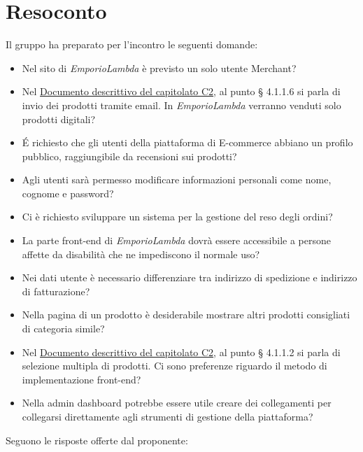 \section{Resoconto}
Il gruppo ha preparato per l'incontro le seguenti domande:
\begin{itemize}
\item Nel sito di \textit{EmporioLambda} è previsto un solo utente Merchant?
\item Nel \href{https://www.math.unipd.it/~tullio/IS-1/2020/Progetto/C2.pdf}{Documento descrittivo del capitolato C2}, al punto § 4.1.1.6 si parla di invio dei prodotti tramite email. In \textit{EmporioLambda} verranno venduti solo prodotti digitali?
\item É richiesto che gli utenti della piattaforma di E-commerce abbiano un profilo pubblico, raggiungibile da recensioni sui prodotti?
\item Agli utenti sarà permesso modificare informazioni personali come nome, cognome e password?
\item Ci è richiesto sviluppare un sistema per la gestione del reso degli ordini?
\item La parte front-end di \textit{EmporioLambda} dovrà essere accessibile a persone affette da disabilità che ne impediscono il normale uso?
\item Nei dati utente è necessario differenziare tra indirizzo di spedizione e indirizzo di fatturazione?
\item Nella pagina di un prodotto è desiderabile mostrare altri prodotti consigliati di categoria simile?
\item Nel \href{https://www.math.unipd.it/~tullio/IS-1/2020/Progetto/C2.pdf}{Documento descrittivo del capitolato C2}, al punto § 4.1.1.2 si parla di selezione multipla di prodotti. Ci sono preferenze riguardo il metodo di implementazione front-end?
\item Nella admin dashboard potrebbe essere utile creare dei collegamenti per collegarsi direttamente agli strumenti di gestione della piattaforma?
\end{itemize}
Seguono le risposte offerte dal proponente:
